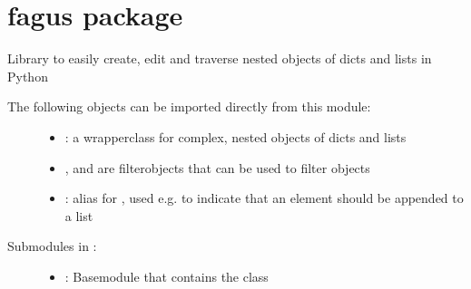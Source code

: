 \documentclass[a4paper,10pt,english]{sphinxmanual}
\begin{document}
\chapter{fagus package}
\label{\detokenize{fagus:module-fagus}}\label{\detokenize{fagus:fagus-package}}\label{\detokenize{fagus::doc}}
\sphinxAtStartPar
Library to easily create, edit and traverse nested objects of dicts and lists in Python
\begin{description}
\item[{The following objects can be imported directly from this module:}] \leavevmode\begin{itemize}
\item {}
\sphinxAtStartPar
{\hyperref[\detokenize{fagus.fagus:fagus.fagus.Fagus}]{}}: a wrapper\sphinxhyphen{}class for complex, nested objects of dicts and lists

\item {}
\sphinxAtStartPar
{\hyperref[\detokenize{fagus.filters:fagus.filters.Fil}]{}}, {\hyperref[\detokenize{fagus.filters:fagus.filters.CFil}]{}} and {\hyperref[\detokenize{fagus.filters:fagus.filters.VFil}]{}} are filter\sphinxhyphen{}objects that can
be used to filter {\hyperref[\detokenize{fagus.fagus:fagus.fagus.Fagus}]{}}\sphinxhyphen{}objects

\item {}
\sphinxAtStartPar
{}: alias for , used e.g. to indicate that an element should be appended to
a list

\end{itemize}

\item[{Submodules in {\hyperref[\detokenize{fagus:module-fagus}]{}}:}] \leavevmode\begin{itemize}
\item {}
\sphinxAtStartPar
{\hyperref[\detokenize{fagus.fagus:module-fagus.fagus}]{}}: Base\sphinxhyphen{}module that contains the {\hyperref[\detokenize{fagus.fagus:fagus.fagus.Fagus}]{}}\sphinxhyphen{}class


\end{itemize}
\end{description}
\end{document}
